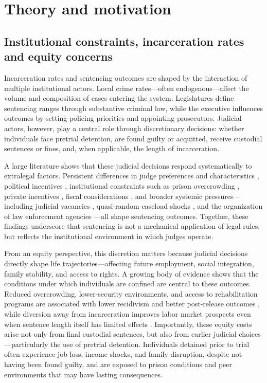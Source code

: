 \section{Theory and motivation}
\label{sec:lit}
\subsection*{Institutional constraints, incarceration rates and equity concerns}

Incarceration rates and sentencing outcomes are shaped by the interaction of multiple institutional actors. Local crime rates—often endogenous—affect the volume and composition of cases entering the system. Legislatures define sentencing ranges through substantive criminal law, while the executive influences outcomes by setting policing priorities and appointing prosecutors. Judicial actors, however, play a central role through discretionary decisions: whether individuals face pretrial detention, are found guilty or acquitted, receive custodial sentences or fines, and, when applicable, the length of incarceration. 

A large literature shows that these judicial decisions respond systematically to extralegal factors. Persistent differences in judge preferences and characteristics \citep{Kling-Random, Aizer-Juvenile}, political incentives \citep{Gordon-Judges-Election, Berdejo-PoliticalCycles}, institutional constraints such as prison overcrowding \citep{Schnepel}, private incentives \citep{Galinato-2020, Mukherjee-Private, Dippel}, fiscal considerations \citep{Ouss-Incentives}, and broader systemic pressures—including judicial vacancies \citep{Yang-Resource-AEJ}, quasi-random caseload shocks \citep{JudgeCaseloads-JPE-Shumway}, and the organization of law enforcement agencies \citep{Ater-Police-Org-JPE}—all shape sentencing outcomes. Together, these findings underscore that sentencing is not a mechanical application of legal rules, but reflects the institutional environment in which judges operate.

From an equity perspective, this discretion matters because judicial decisions directly shape life trajectories—affecting future employment, social integration, family stability, and access to rights. A growing body of evidence shows that the conditions under which individuals are confined are central to these outcomes. Reduced overcrowding, lower-security environments, and access to rehabilitation programs are associated with lower recidivism and better post-release outcomes \citep{Tobon, Mastro, Chen, Williams}, while diversion away from incarceration improves labor market prospects even when sentence length itself has limited effects \citep{Schnepel, Kling-Random}. Importantly, these equity costs arise not only from final custodial sentences, but also from earlier judicial choices—particularly the use of pretrial detention. Individuals detained prior to trial often experience job loss, income shocks, and family disruption, despite not having been found guilty, and are exposed to prison conditions and peer environments that may have lasting consequences.


